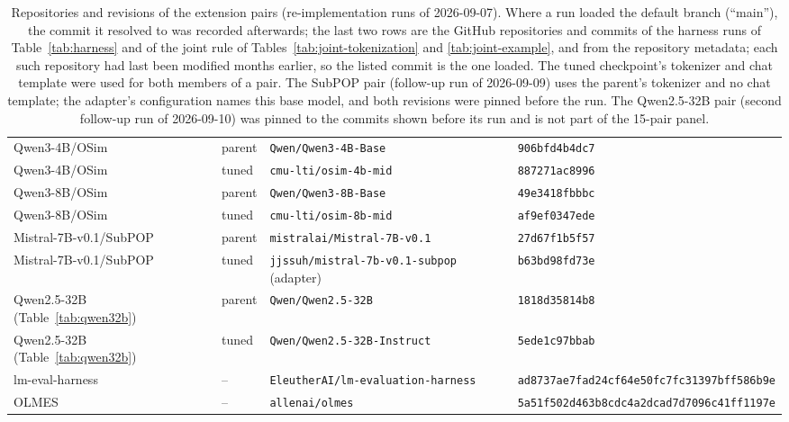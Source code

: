 \begin{table}[t]
\begin{tabular}{@{}llll@{}}
Qwen3-4B/OSim & parent & \texttt{Qwen/Qwen3-4B-Base} & \texttt{906bfd4b4dc7} \\
Qwen3-4B/OSim & tuned & \texttt{cmu-lti/osim-4b-mid} & \texttt{887271ac8996} \\
Qwen3-8B/OSim & parent & \texttt{Qwen/Qwen3-8B-Base} & \texttt{49e3418fbbbc} \\
Qwen3-8B/OSim & tuned & \texttt{cmu-lti/osim-8b-mid} & \texttt{af9ef0347ede} \\
Mistral-7B-v0.1/SubPOP & parent & \texttt{mistralai/Mistral-7B-v0.1} & \texttt{27d67f1b5f57} \\
Mistral-7B-v0.1/SubPOP & tuned & \texttt{jjssuh/mistral-7b-v0.1-subpop} (adapter) & \texttt{b63bd98fd73e} \\
Qwen2.5-32B (Table~\ref{tab:qwen32b}) & parent & \texttt{Qwen/Qwen2.5-32B} & \texttt{1818d35814b8} \\
Qwen2.5-32B (Table~\ref{tab:qwen32b}) & tuned & \texttt{Qwen/Qwen2.5-32B-Instruct} & \texttt{5ede1c97bbab} \\
\addlinespace[2pt]
lm-eval-harness & -- & \texttt{EleutherAI/lm-evaluation-harness} & \texttt{ad8737ae7fad24cf64e50fc7fc31397bff586b9e} \\
OLMES & -- & \texttt{allenai/olmes} & \texttt{5a51f502d463b8cdc4a2dcad7d7096c41ff1197e} \\
\bottomrule
\end{tabular}
\caption{Repositories and revisions of the extension pairs (re-implementation runs of 2026-09-07). Where a run loaded the default branch (``main''), the commit it resolved to was recorded afterwards; the last two rows are the GitHub repositories and commits of the harness runs of Table~\ref{tab:harness} and of the joint rule of Tables~\ref{tab:joint-tokenization} and \ref{tab:joint-example}, and from the repository metadata; each such repository had last been modified months earlier, so the listed commit is the one loaded. The tuned checkpoint's tokenizer and chat template were used for both members of a pair. The SubPOP pair (follow-up run of 2026-09-09) uses the parent's tokenizer and no chat template; the adapter's configuration names this base model, and both revisions were pinned before the run. The Qwen2.5-32B pair (second follow-up run of 2026-09-10) was pinned to the commits shown before its run and is not part of the 15-pair panel.}
\label{tab:extension-revisions}
\end{table}
